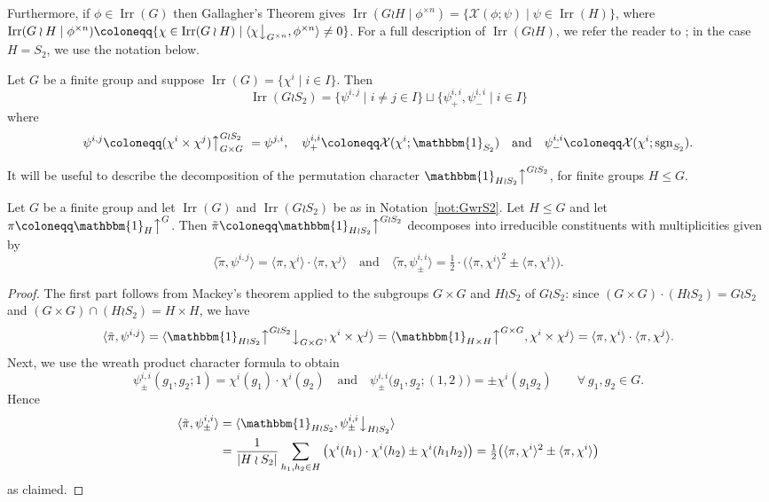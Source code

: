 \documentclass[ALCO, Unicode]{cedram}
\newcommand{\triv}{\mathbbm{1}}
\newcommand{\Irr}{\operatorname{Irr}}
\newcommand{\sgn}{\operatorname{sgn}}
\newcommand{\down}{\big\downarrow}
\newcommand{\up}{\big\uparrow}
\newcommand{\cX}{\mathcal{X}}
\begin{document}
Furthermore, if $\phi\in\Irr(G)$ then Gallagher's Theorem \cite[Corollary 6.17]{I} gives $\Irr(G\wr H\mid \phi^{\times n}) = \{\cX(\phi;\psi)\mid \psi\in\Irr(H)\}$, where $\Irr(G\wr H\mid \phi^{\times n})\coloneqq \{\chi\in\Irr(G\wr H)\mid \langle \chi\down_{G^{\times n}}, \phi^{\times n}\rangle \ne 0 \}$.
For a full description of $\Irr(G\wr H)$, we refer the reader to \cite[Chapter 4]{JK}; in the case $H=S_2$, we use the notation below.

\begin{notation}\label{not:GwrS2}
	Let $G$ be a finite group and suppose $\Irr(G)=\{\chi^i \mid i\in I\}$. Then 
	\[ \Irr(G\wr S_2) = \{ \psi^{i,j} \mid i\ne j\in I \} \sqcup \{ \psi^{i,i}_+, \psi^{i,i}_- \mid i\in I \} \]
	where 
	\[ \psi^{i,j} \coloneqq  (\chi^i\times\chi^j)\up_{G\times G}^{G\wr S_2}\ = \psi^{j,i},\quad \psi^{i,i}_{+} \coloneqq  \cX(\chi^i;\triv_{S_2})\quad\text{and}\quad \psi^{i,i}_{-} \coloneqq  \cX(\chi^i;\sgn_{S_2}). \]
\end{notation}

It will be useful to describe the decomposition of the permutation character $\triv_{H\wr S_2}\up^{G\wr S_2}$, for finite groups $H\le G$.

\begin{lemma}\label{lem:Prop1.2}
	Let $G$ be a finite group and let $\Irr(G)$ and $\Irr(G\wr S_2)$ be as in Notation~\ref{not:GwrS2}.
	Let $H\leq G$ and let $\pi \coloneqq  \triv_{H}\up^{G}$. Then $\tilde{\pi} \coloneqq  \triv_{H\wr S_2}\up^{G\wr S_2}$ decomposes into irreducible constituents with multiplicities given by
	\[ \langle\tilde{\pi},\psi^{i,j}\rangle = \langle\pi,\chi^i\rangle \cdot \langle\pi,\chi^j\rangle \quad\text{and}\quad \langle\tilde{\pi},\psi^{i,i}_{\pm}\rangle = \tfrac{1}{2}\cdot\big( \langle\pi,\chi^i\rangle^2 \pm \langle\pi,\chi^i\rangle \big). \]
\end{lemma}

\begin{proof}
	The first part follows from Mackey's theorem applied to the subgroups $G\times G$ and $H\wr S_2$ of $G\wr S_2$: since $(G\times G)\cdot (H\wr S_2)=G\wr S_2$ and $(G\times G)\cap (H\wr S_2)=H\times H$, we have
	\[ \langle\tilde{\pi},\psi^{i,j}\rangle	= \langle \triv_{H\wr S_2}\up^{G\wr S_2}\down_{G\times G}, \chi^i\times\chi^j\rangle = \langle \triv_{H\times H}\up^{G\times G}, \chi^i\times \chi^j\rangle = \langle\pi,\chi^i\rangle \cdot \langle\pi,\chi^j\rangle. \]
	Next, we use the wreath product character formula \cite[Lemma 4.3.9]{JK} to obtain
	\[ \psi^{i,i}_{\pm}(g_1,g_2;1) = \chi^i(g_1)\cdot\chi^i(g_2)\quad\text{and}\quad\psi^{i,i}_{\pm}\big(g_1,g_2;(1,2)\big) = \pm\chi^i(g_1 g_2) \qquad\forall\ g_1, g_2\in G. \]
	Hence
	\begin{align*}
		\langle\tilde{\pi},\psi^{i,i}_{\pm}\rangle &= \langle\triv_{H\wr S_2},\psi^{i,i}_{\pm}\down_{H\wr S_2}\rangle\\
		&= \frac{1}{|H\wr S_2|}\sum_{h_1,h_2\in H}\big(\chi^i(h_1)\cdot\chi^i(h_2)\pm\chi^i(h_1 h_2)\big) = \tfrac{1}{2}\big(\langle\pi,\chi^i\rangle^2\pm \langle\pi,\chi^i\rangle\big)
	\end{align*}
	as claimed.
\end{proof}
\end{document}
